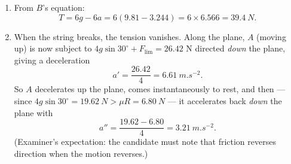 \documentclass[11pt]{article}
\begin{document}
\begin{corrige}
\begin{enumerate}
Equations of motion (string inextensible: same $a$ for both):
\begin{align*}
B:\quad 6g-T &= 6a,\\
A:\quad T-4g\sin 30^{\circ}-F_{\lim} &= 4a.
\end{align*}
Adding: $6g-4g\sin 30^{\circ}-F_{\lim}=10a$:
\[ a=\dfrac{58.86-19.62-6.80}{10}=\dfrac{32.44}{10}=\SI{3.24}{m.s^{-2}}. \]
\item From $B$'s equation:
\[ T=6g-6a=6(9.81-3.244)=6\times 6.566=\SI{39.4}{N}. \]
\item When the string breaks, the tension vanishes. Along the plane, $A$ (moving up) is now subject to $4g\sin30^{\circ}+F_{\lim}=26.42$ $\mathrm{N}$ directed \emph{down} the plane, giving a deceleration
\[ a'=\dfrac{26.42}{4}=\SI{6.61}{m.s^{-2}}. \]
So $A$ decelerates up the plane, comes instantaneously to rest, and then --- since $4g\sin30^{\circ}=\SI{19.62}{N}>\mu R=\SI{6.80}{N}$ --- it accelerates back \emph{down} the plane with
\[ a''=\dfrac{19.62-6.80}{4}=\SI{3.21}{m.s^{-2}}. \]
(Examiner's expectation: the candidate must note that friction reverses direction when the motion reverses.)
\end{enumerate}
\end{corrige}
\end{document}
